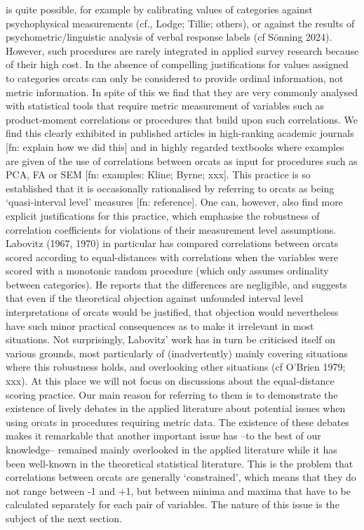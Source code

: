 \documentclass[
  12pt,
]{article}
\theoremstyle{plain}
\theoremstyle{definition}
\theoremstyle{remark}
\begin{document}
is quite possible, for example by calibrating values of categories
against psychophysical measurements (cf., Lodge; Tillie; others), or
against the results of psychometric/linguistic analysis of verbal
response labels (cf Sönning 2024). However, such procedures are rarely
integrated in applied survey research because of their high cost. In the
absence of compelling justifications for values assigned to categories
orcats can only be considered to provide ordinal information, not metric
information. In spite of this we find that they are very commonly
analysed with statistical tools that require metric measurement of
variables such as product-moment correlations or procedures that build
upon such correlations. We find this clearly exhibited in published
articles in high-ranking academic journals {[}fn: explain how we did
this{]} and in highly regarded textbooks where examples are given of the
use of correlations between orcats as input for procedures such as PCA,
FA or SEM {[}fn: examples: Kline; Byrne; xxx{]}. This practice is so
established that it is occasionally rationalised by referring to orcats
as being `quasi-interval level' measures {[}fn: reference{]}. One can,
however, also find more explicit justifications for this practice, which
emphasise the robustness of correlation coefficients for violations of
their measurement level assumptions. Labovitz (1967, 1970) in particular
has compared correlations between orcats scored according to
equal-distances with correlations when the variables were scored with a
monotonic random procedure (which only assumes ordinality between
categories). He reports that the differences are negligible, and
suggests that even if the theoretical objection against unfounded
interval level interpretations of orcats would be justified, that
objection would nevertheless have such minor practical consequences as
to make it irrelevant in most situations. Not surprisingly, Labovitz'
work has in turn be criticised itself on various grounds, most
particularly of (inadvertently) mainly covering situations where this
robustness holds, and overlooking other situations (cf O'Brien 1979;
xxx). At this place we will not focus on discussions about the
equal-distance scoring practice. Our main reason for referring to them
is to demonstrate the existence of lively debates in the applied
literature about potential issues when using orcats in procedures
requiring metric data. The existence of these debates makes it
remarkable that another important issue has --to the best of our
knowledge-- remained mainly overlooked in the applied literature while
it has been well-known in the theoretical statistical literature. This
is the problem that correlations between orcats are generally
`constrained', which means that they do not range between -1 and +1, but
between minima and maxima that have to be calculated separately for each
pair of variables. The nature of this issue is the subject of the next
section.
\end{document}
